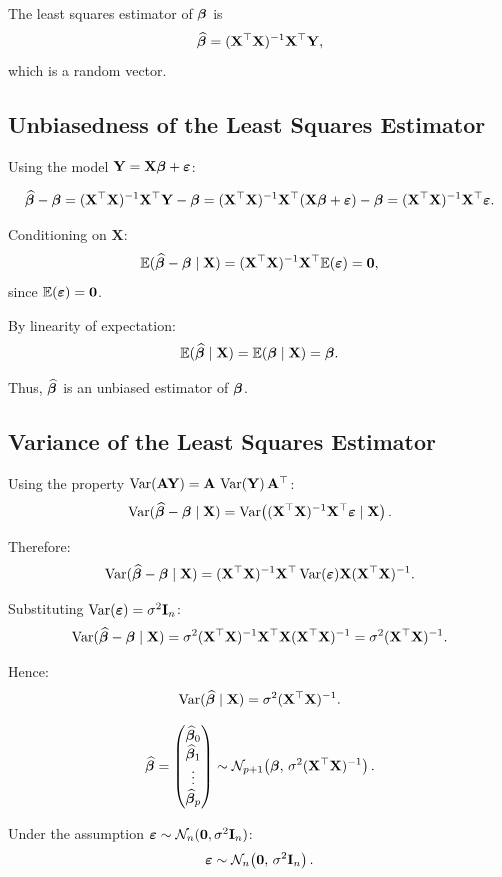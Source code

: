 The least squares estimator of $\boldsymbol{\beta}$ is
\[
\widehat{\boldsymbol{\beta}} = (\mathbf{X}^\top \mathbf{X})^{-1}\mathbf{X}^\top \mathbf{Y},
\]
which is a random vector.

\subsection{Unbiasedness of the Least Squares Estimator}

Using the model $\mathbf{Y} = \mathbf{X}\boldsymbol{\beta} + \boldsymbol{\varepsilon}$:

\[
\widehat{\boldsymbol{\beta}} - \boldsymbol{\beta}
= (\mathbf{X}^\top \mathbf{X})^{-1}\mathbf{X}^\top \mathbf{Y} - \boldsymbol{\beta}
= (\mathbf{X}^\top \mathbf{X})^{-1}\mathbf{X}^\top (\mathbf{X}\boldsymbol{\beta} + \boldsymbol{\varepsilon}) - \boldsymbol{\beta}
= (\mathbf{X}^\top \mathbf{X})^{-1}\mathbf{X}^\top \boldsymbol{\varepsilon}.
\]

Conditioning on $\mathbf{X}$:
\[
\mathbb{E}(\widehat{\boldsymbol{\beta}} - \boldsymbol{\beta} \mid \mathbf{X})
=
(\mathbf{X}^\top \mathbf{X})^{-1}\mathbf{X}^\top \mathbb{E}(\boldsymbol{\varepsilon})
=
\mathbf{0},
\]
since $\mathbb{E}(\boldsymbol{\varepsilon}) = \mathbf{0}$.

By linearity of expectation:
\[
\mathbb{E}(\widehat{\boldsymbol{\beta}} \mid \mathbf{X})
=
\mathbb{E}(\boldsymbol{\beta} \mid \mathbf{X})
=
\boldsymbol{\beta}.
\]

Thus, $\widehat{\boldsymbol{\beta}}$ is an unbiased estimator of $\boldsymbol{\beta}$.

\subsection{Variance of the Least Squares Estimator}

Using the property $\operatorname{Var}(\mathbf{A}\mathbf{Y}) = \mathbf{A}\,\operatorname{Var}(\mathbf{Y})\,\mathbf{A}^\top$:
\[
\operatorname{Var}(\widehat{\boldsymbol{\beta}} - \boldsymbol{\beta} \mid \mathbf{X})
=
\operatorname{Var}\!\left( (\mathbf{X}^\top \mathbf{X})^{-1}\mathbf{X}^\top \boldsymbol{\varepsilon} \mid \mathbf{X} \right).
\]

Therefore:
\[
\operatorname{Var}(\widehat{\boldsymbol{\beta}} - \boldsymbol{\beta} \mid \mathbf{X})
=
(\mathbf{X}^\top \mathbf{X})^{-1}\mathbf{X}^\top
\operatorname{Var}(\boldsymbol{\varepsilon})
\mathbf{X}(\mathbf{X}^\top \mathbf{X})^{-1}.
\]

Substituting $\operatorname{Var}(\boldsymbol{\varepsilon}) = \sigma^2 \mathbf{I}_n$:
\[
\operatorname{Var}(\widehat{\boldsymbol{\beta}} - \boldsymbol{\beta} \mid \mathbf{X})
=
\sigma^2(\mathbf{X}^\top \mathbf{X})^{-1}\mathbf{X}^\top \mathbf{X}(\mathbf{X}^\top \mathbf{X})^{-1}
=
\sigma^2(\mathbf{X}^\top \mathbf{X})^{-1}.
\]

Hence:
\[
\operatorname{Var}(\widehat{\boldsymbol{\beta}} \mid \mathbf{X})
=
\sigma^2(\mathbf{X}^\top \mathbf{X})^{-1}.
\]

\begin{keyresult}
\[
\widehat{\boldsymbol{\beta}}
=
\begin{pmatrix}
\widehat{\boldsymbol{\beta}}_0 \\
\widehat{\boldsymbol{\beta}}_1 \\
\vdots \\
\widehat{\boldsymbol{\beta}}_p
\end{pmatrix}
\sim
\mathcal{N}_{p+1}\!\left(
\boldsymbol{\beta},\,
\sigma^2(\mathbf{X}^\top \mathbf{X})^{-1}
\right).
\]

Under the assumption $\boldsymbol{\varepsilon} \sim \mathcal{N}_n(\mathbf{0}, \sigma^2 \mathbf{I}_n)$:
\[
\boldsymbol{\varepsilon} \sim \mathcal{N}_n\!\left(\mathbf{0},\, \sigma^2 \mathbf{I}_n\right).
\]
\end{keyresult}

